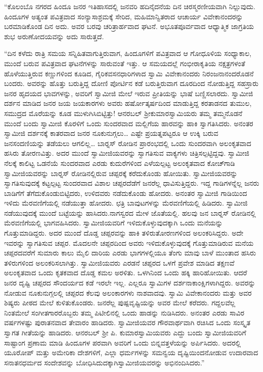  “ಕೊಲಂಬೊ ನಗರದ ಹಿಂದೂ ಜನರ ಇತಿಹಾಸದಲ್ಲಿ ಜನವರಿ ಹದಿನೈದನೆಯ ದಿನ ಚಿರಸ್ಮರಣೀಯವಾಗಿ ನಿಲ್ಲುವುದು. ಹಿಂದೂಗಳ ಅತ್ಯಂತ ಪವಿತ್ರವಾದ ಸಂನ್ಯಾಸಾಶ್ರಮಕ್ಕೆ ಸೇರಿದ, ಮಹಿಮಾನ್ವಿತರಾದ ಆಚಾರ್ಯ ವಿವೇಕಾನಂದರನ್ನು ಬರಮಾಡಿಕೊಂಡ ದಿನ ಅದು. ಅವರ ಬರವು ಚರಿತ್ರಾರ್ಹವಾದ ಘಟನೆ. ಅಭೂತಪೂರ್ವವಾದ ಆಧ್ಯಾತ್ಮಿಕ ಜಾಗ್ರತಿಯ ಶುಭ ಅರುಣೋದಯವನ್ನು ಅದು ಸಾರುತ್ತದೆ. 

 “ದಿನ ಕಳೆದು ರಾತ್ರಿ ಸಮಯ ಸನ್ನಿಹಿತವಾಗುತ್ತಿರುವಾಗ, ಹಿಂದೂಗಳಿಗೆ ಪವಿತ್ರವಾದ ಆ ಗೋಧೂಳಿಯ ಸಂಧ್ಯಾಕಾಲ, ಮುಂದೆ ಬರುವ ಪವಿತ್ರವಾದ ಘಟನೆಗಳನ್ನು ಸಾರುವಂತೆ ಇತ್ತು. ಆ ಸಮಯದಲ್ಲೆ ಗಂಭೀರಾಕೃತಿಯ ನಕ್ಷತ್ರಗಳಂತೆ ಹೊಳೆಯುತ್ತಿರುವ ಕಣ್ಣುಗಳಿಂದ ಕೂಡಿದ, ಗೈರಿಕವಸನಧಾರಿಗಳಾದ ಸ್ವಾಮಿ ವಿವೇಕಾನಂದರು ನಿರಂಜನಾನಂದರೊಡನೆ ಬಂದರು. ಅವರನ್ನು ಹೊತ್ತು ಬರುತ್ತಿದ್ದ ದೋಣಿ ಪೋರ್ಟಿನ ಕಡೆ ಬರುತ್ತಿರುವಾಗ ದೂರದಿಂದ ನೋಡುತ್ತಿದ್ದ ಸಹಸ್ರಾರು ಜನರ ಹೃದಯದ ಭಾವಗಳನ್ನು, ಅವರಿಗೆ ಸ್ವಾಮೀಜಿ ಮೇಲೆ ಇರುವ ಪ್ರೀತಿಯನ್ನು ಭಾಷೆ ಬಣ್ಣಿಸಲಾರದು. ಸ್ವಾಮೀಜಿ ದರ್ಶನ ಮಾಡಿದ ಜನರ ಜಯ ಜಯಕಾರಗಳು ಅವರು ಹರ್ಷೋತ್ಕರ್ಷದಿಂದ ಮಾಡುತ್ತಿದ್ದ ಕರತಾಡನದ ತುಮುಲ, ಸಮುದ್ರದ ಮೊರೆಯನ್ನು ಕೂಡ ಮುಳುಗಿಸಿಬಿಟ್ಟಿತ್ತು! ಆನರಬಲ್ ಶ‍್ರೀಕುಮಾರಸ್ವಾಮಿಯರು ತಮ್ಮ ತಮ್ಮನೊಡನೆ ಮುಂದೆ ಬಂದು ಸ್ವಾಮೀಜಿ ಕೊರಳಿಗೆ ಒಂದು ಸುಂದರವಾದ ಮಲ್ಲಿಗೆಯ ಹಾರವನ್ನು ಹಾಕಿ ಸ್ವಾಗತಿಸಿದರು. ಅನಂತರ ಸ್ವಾಮೀಜಿ ದರ್ಶನಕ್ಕೆ ಕಾತರವಾದ ಜನರ ನೂಕುನುಗ್ಗಲು… ಎಷ್ಟೇ ಪ್ರಯತ್ನಪಟ್ಟರೂ ಆ ಉಕ್ಕಿ ಬರುವ ಜನಸಂದಣಿಯನ್ನು ತಡೆಯಲು ಆಗಲಿಲ್ಲ… ಬಾರ್‍ನಸ್ ರೋಡಿನ ಪ್ರಾರಂಭದಲ್ಲಿ ಒಂದು ಸುಂದರವಾಗಿ ಅಲಂಕೃತವಾದ ಹಸಿರು ತೋರಣವಿತ್ತು. ಅದರ ಮುಂದೆ ಸ್ವಾಮೀಜಿಯವರನ್ನು ಸ್ವಾಗತಿಸುವ ವಾಕ್ಯಗಳು ಚಿತ್ರಿಸಲ್ಪಟ್ಟಿದ್ದವು. ಸ್ವಾಮೀಜಿ ನೆಲಕ್ಕೆ ಕಾಲಿಟ್ಟ ಒಡನೆಯೆ ಸುಂದರವಾದ ಎರಡು ಕುದುರೆಗಳಿಂದ ಎಳೆಯಲ್ಪಟ್ಟ ಅಲಂಕೃತವಾದ ಕೋಚ್‍ಗಾಡಿ ಸ್ವಾಮೀಜಿಯವರನ್ನು ಬಾರ್‍ನಸ್ ರೋಡಿನಲ್ಲಿರುವ ಚಪ್ಪರಕ್ಕೆ ಕರೆದುಕೊಂಡು ಹೋಯಿತು. ಸ್ವಾಮೀಜಿಯವರನ್ನು ಸ್ವಾಗತಿಸುವುದಕ್ಕೆ ಕಟ್ಟಲ್ಪಟ್ಟ ಸುಂದರವಾದ ವಿಶಾಲ ಚಪ್ಪರದೆಡೆಗೆ ಜನರೆಲ್ಲ ಧಾವಿಸುತ್ತಿದ್ದರು. ಇದ್ದ ಗಾಡಿಗಳನ್ನೆಲ್ಲ ಜನರು ಬಾಡಿಗೆಗೆ ತೆಗೆದುಕೊಂಡುಬಿಟ್ಟಿದರು, ಉಳಿದವರು ನಡೆದುಕೊಂಡು ಹೋದರು. ಅನಂತರ ಸ್ವಾಮೀಜಿ ಗಾಡಿಯಿಂದ ಇಳಿದು ಮೆರವಣಿಗೆಯಲ್ಲಿ ನಡೆಯುತ್ತಾ ಹೋದರು. ಛತ್ರಿ ಬಾವುಟಗಳನ್ನು ಮೆರವಣಿಗೆಯಲ್ಲಿ ಹಿಡಿದರು. ಸ್ವಾಮೀಜಿ ನಡೆಯುವುದಕ್ಕೆ ಮುಂದೆ ಬಟ್ಟೆಯನ್ನು ಹಾಸಿದರು.\break ನಾಗಸ್ವರದ ಮೇಳ ಜೊತೆಯಲ್ಲಿ. ಹಲವು ಜನ ಬಾರ್‍ನಸ್ ರೋಡಿನಲ್ಲಿ ಮೆರವಣಿಗೆಯಲ್ಲಿ ಭಾಗವಹಿಸಿದರು. ಸ್ವಾಮೀಜಿಯವರಿಗೆ ಇಳಿದುಕೊಳ್ಳುವುದಕ್ಕಾಗಿ ಒಂದು ಮನೆಯನ್ನು ಗೊತ್ತುಮಾಡಿದ್ದರು. ಅದರ ಮುಂದೆ ದೊಡ್ಡ ಚಪ್ಪರವನ್ನು ಹಾಕಿ ತಳಿರು\break ತೋರಣಗಳಿಂದ ಅಲಂಕರಿಸಿದ್ದರು. ಅದೇ ಇವರನ್ನು ಸ್ವಾಗತಿಸುವ ಚಪ್ಪರ. ಮೊದಲನೇ ಚಪ್ಪರದಿಂದ ಅವರು ಇಳಿದುಕೊಳ್ಳುವುದಕ್ಕೆ ಗೊತ್ತುಮಾಡಿರುವ ಮನೆಯ ಚಪ್ಪರದವರೆಗೆ ಸುಮಾರು ಕಾಲು ಮೈಲಿ ದಾರಿಯ ಎರಡು ಭಾಗಗಳಲ್ಲಿಯೂ ತೆಂಗು ಮಾವು ಬಾಳೆ ಮುಂತಾದ ಹಸಿರು ತಳಿರುಗಳಿಂದ ಅಲಂಕರಿಸಲಾಗಿತ್ತು. ಸ್ವಾಮೀಜಿಯವರು ಎರಡನೆ ಚಪ್ಪರದ ಒಳಗೆ ಪ್ರವೇಶ ಮಾಡಿದ ತಕ್ಷಣವೆ ಅಲಂಕೃತವಾದ ಒಂದು ಕೃತಕವಾದ ದೊಡ್ಡ ಕಮಲ ಅರಳಿತು. ಒಳಗಿನಿಂದ ಒಂದು ಹಕ್ಕಿ ಹಾರಿಹೋಯಿತು. ಆದರೆ ಜನರ ದೃಷ್ಟಿ ಚಪ್ಪರದ ಸೌಂದರ್ಯದ ಕಡೆ ಇರಲೇ ಇಲ್ಲ. ಎಲ್ಲರೂ ಸ್ವಾಮಿಗಳ ದರ್ಶನಾಕಾಂಕ್ಷಿಗಳಾಗಿದ್ದರು. ಅವರನ್ನು ನೋಡುವ ನೂಕುನುಗ್ಗಲಲ್ಲಿ ಚಪ್ಪರದ ಕೆಲವು ಅಲಂಕಾರಗಳು ನಾಶವಾದವು. ಸ್ವಾಮಿ ವಿವೇಕಾನಂದರು ಮತ್ತು ಅವರ ಶಿಷ್ಯರು ಪೀಠದ ಮೇಲೆ ಕುಳಿತುಕೊಂಡರು. ಜನರೆಲ್ಲ ಪುಷ್ಪವೃಷ್ಟಿಯನ್ನು ಅವರ ಮೇಲೆ ಕರೆದರು. ಗದ್ದಲವೆಲ್ಲ ನಿಂತಮೇಲೆ ಸಂಗೀತಗಾರರೊಬ್ಬರು ತಮ್ಮ ಪಿಟೀಲಿನಲ್ಲಿ ಒಂದು ಹಾಡನ್ನು ನುಡಿಸಿದರು. ಅನಂತರ ಎರಡು ಸಾವಿರ ವರ್ಷಗಳಷ್ಟು ಪುರಾತನವಾದ ತೇವಾರಂ ಹಾಡಿದರು. ಸ್ವಾಮೀಜಿಯವರ ಗೌರವಾರ್ಥವಾಗಿ ರಚಿಸಿದ ಒಂದು ಸಂಸ್ಕೃತ ಸ್ವಾಗತ ಗೀತೆಯನ್ನು ಹಾಡಿದರು. ಆನರಬಲ್ ಶ‍್ರೀ ಪಿ. ಕುಮಾರಸ್ವಾಮಿಯವರು ಎದ್ದು ಬಂದು ಸ್ವಾಮೀಜಿಯವರಿಗೆ ಸಾಷ್ಟಾಂಗ ಪ್ರಣಾಮ ಮಾಡಿ ಹಿಂದೂಗಳ ಪರವಾಗಿ ಅವರಿಗೆ ಒಂದು ಬಿನ್ನವತ್ತಳೆಯನ್ನು ಅರ್ಪಿಸಿದರು. ಅದರಲ್ಲಿ ಯೂರೋಪ್ ಮತ್ತು ಅಮೇರಿಕಾ ದೇಶಗಳಿಗೆ, ಎಲ್ಲಾ ಧರ್ಮಗಳನ್ನು ಸಮನ್ವಯ ದೃಷ್ಟಿಯಿಂದ\break ನೋಡುವ ಉದಾರವಾದ ಸನಾತನಧರ್ಮದ ಸಂದೇಶವನ್ನು ಬೋಧಿಸಿದುದಕ್ಕಾಗಿ\break ಸ್ವಾಮೀಜಿಯವರನ್ನು ಅಭಿನಂದಿಸಿದರು.” 

